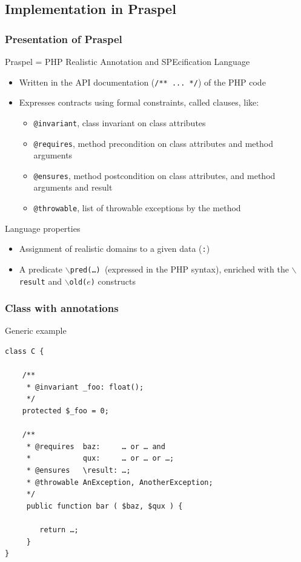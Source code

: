 \documentclass[9pt]{beamer}
\newcommand{\code}[1]{\texttt{#1}}
\begin{document}
\subsection{Implementation in Praspel}

\begin{frame}
\frametitle{Presentation of Praspel}

\begin{block}{Praspel = PHP Realistic Annotation and SPEcification Language}
\begin{itemize}
\item Written in the API documentation (\code{/** ... */}) of the PHP code
\item Expresses contracts using formal constraints, called clauses, like:
  \begin{itemize}
  \item \code{@invariant}, class invariant on class attributes
  \item \code{@requires}, method precondition on class attributes and method
  arguments
  \item \code{@ensures}, method postcondition on class attributes, and method
  arguments and result
  \item \code{@throwable}, list of throwable exceptions by the method
  \end{itemize}
\end{itemize}
\end{block}

\begin{block}{Language properties}
\begin{itemize}
\item Assignment of realistic domains to a given data (\code{:})
\item A predicate $\backslash$\code{pred(…) }(expressed in the PHP
syntax), enriched with the $\backslash$\code{result} and
$\backslash$\code{old($e$)} constructs
\end{itemize}
\end{block}

\end{frame}

\begin{frame}[fragile]
\frametitle{Class with annotations}

\begin{exampleblock}{Generic example}
{
\small
\begin{verbatim}
class C {

    /**
     * @invariant _foo: float();
     */
    protected $_foo = 0;

    /**
     * @requires  baz:     … or … and
     *            qux:     … or … or …;
     * @ensures   \result: …;
     * @throwable AnException, AnotherException;
     */
     public function bar ( $baz, $qux ) {

        return …;
     }
}
\end{verbatim}
}
\end{exampleblock}

\end{frame}
\end{document}
